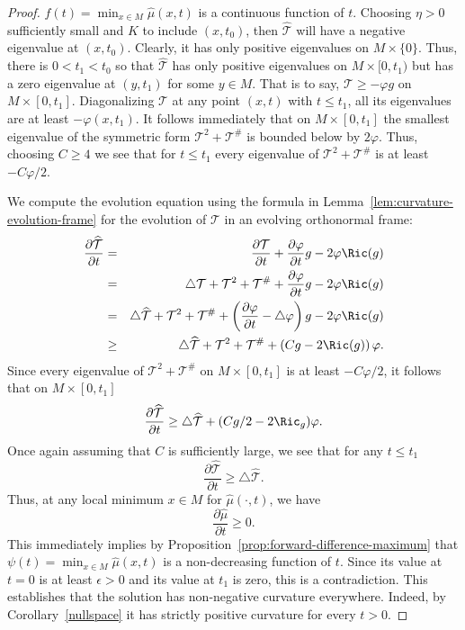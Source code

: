\begin{proof}
$f(t)=\min_{x\in M}\hat\mu(x,t)$ is a continuous function of
$t$. Choosing $\eta>0$ sufficiently small and $K$ to include
$(x,t_0)$, then $\widehat{\mathcal T}$ will have a negative
eigenvalue at $(x,t_0)$. Clearly, it has only positive eigenvalues
on $M\times \{0\}$. Thus, there is $0<t_1<t_0$ so that
$\widehat{\mathcal T}$ has only positive eigenvalues on $M\times
[0,t_1)$ but has a zero eigenvalue at $(y,t_1)$ for some $y\in M$.
That is to say, ${\mathcal T}\ge -\varphi g$ on $M\times [0,t_1]$.
Diagonalizing ${\mathcal T}$ at any point $(x,t)$ with $t\le t_1$,
all its eigenvalues are at least $-\varphi(x,t_1)$. It follows
immediately that on $M\times [0,t_1]$ the smallest eigenvalue of the
symmetric form ${\mathcal T}^2+{\mathcal T}^\#$ is bounded below by
$2\varphi$. Thus, choosing $C\ge 4$  we see that for $t\le t_1$
every eigenvalue of ${\mathcal T}^2+{\mathcal T}^\#$ is at least
$-C\varphi/2$.


We compute the evolution equation using the formula in
Lemma~\ref{lem:curvature-evolution-frame} for the evolution of ${\mathcal T}$ in an evolving
orthonormal frame:
\begin{eqnarray*}\frac{\partial \widehat{\mathcal T}}{\partial t} & = &
\frac{\partial{\mathcal T}}{\partial t}+\frac{\partial
\varphi}{\partial t}g-2\varphi \Ric(g) \\
& = & \triangle {\mathcal T}+{\mathcal T}^2+{\mathcal T}^\#+\frac{\partial \varphi}{\partial t}g-2\varphi \Ric(g) \\
& = & \triangle \widehat{\mathcal T}+{\mathcal T}^2+{\mathcal
T}^\#+\left(\frac{\partial \varphi}{\partial t}-\triangle
\varphi\right)g-2\varphi \Ric(g)\\
&\ge & \triangle \widehat{\mathcal T}+{\mathcal T}^2+{\mathcal
T}^\#+\left(Cg-2\Ric(g)\right)\varphi.
\end{eqnarray*}
Since every eigenvalue of ${\mathcal T}^2+{\mathcal T}^\#$  on
$M\times [0,t_1]$ is at least $-C\varphi/2$, it follows that on
$M\times [0,t_1]$
$$\frac{\partial \widehat{\mathcal T}}{\partial t}\ge
 \triangle \widehat{\mathcal T}+(Cg/2-2\Ric_g)\varphi.$$ Once again assuming that $C$ is
sufficiently large, we see that for any $t\le t_1$
$$\frac{\partial \widehat{\mathcal T}}{\partial t}\ge \triangle
\widehat {\mathcal T}.$$ Thus, at any local minimum $x\in M$ for
$\hat\mu(\cdot,t)$, we have
$$\frac{\partial \hat\mu}{\partial t}\ge 0.$$
This immediately implies by Proposition~\ref{prop:forward-difference-maximum} that
$\psi(t)=\min_{x\in M}\hat\mu(x,t)$ is a non-decreasing
function of $t$. Since its value at $t=0$ is at least $\epsilon>0$
and its value at $t_1$ is zero, this is a contradiction. This
establishes that the solution has non-negative curvature everywhere.
Indeed, by Corollary~\ref{nullspace} it has strictly positive
curvature for every $t>0$.
\end{proof}





